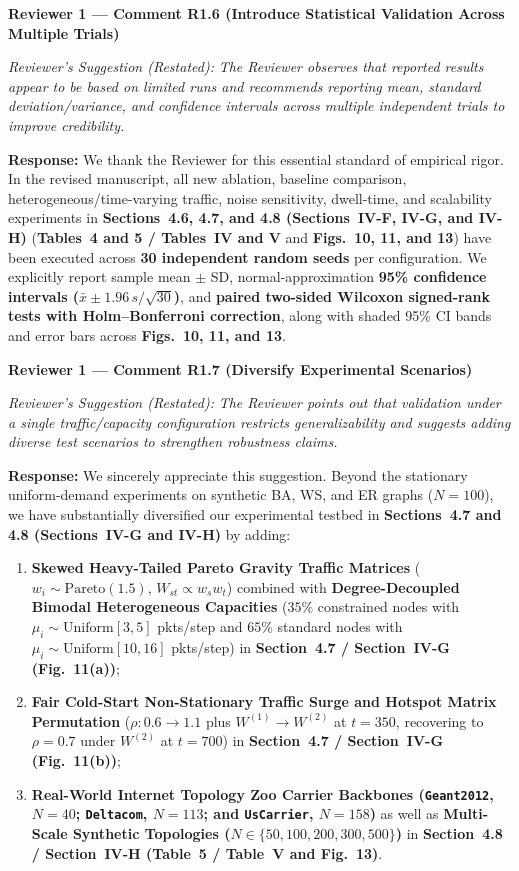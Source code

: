 \documentclass[11pt,a4paper]{article}
\newcommand{\cbox}[2]{%
  \vspace{0.6em}\noindent\textbf{#1}\par\smallskip
  \noindent\textit{Reviewer's Suggestion (Restated):} \textit{#2}\par\smallskip
}
\begin{document}
\hrulefill

\cbox{Reviewer 1 --- Comment R1.6 (Introduce Statistical Validation Across Multiple Trials)}{The Reviewer observes that reported results appear to be based on limited runs and recommends reporting mean, standard deviation/variance, and confidence intervals across multiple independent trials to improve credibility.}

\noindent\textbf{Response:} We thank the Reviewer for this essential standard of empirical rigor. In the revised manuscript, all new ablation, baseline comparison, heterogeneous/time-varying traffic, noise sensitivity, dwell-time, and scalability experiments in \textbf{Sections~4.6, 4.7, and 4.8 (Sections~IV-F, IV-G, and IV-H)} (\textbf{Tables~4 and 5 / Tables~IV and V} and \textbf{Figs.~10, 11, and 13}) have been executed across \textbf{30 independent random seeds} per configuration. We explicitly report sample mean $\pm$ SD, normal-approximation \textbf{95\% confidence intervals ($\bar{x} \pm 1.96\,s/\sqrt{30}$)}, and \textbf{paired two-sided Wilcoxon signed-rank tests with Holm--Bonferroni correction}, along with shaded 95\% CI bands and error bars across \textbf{Figs.~10, 11, and 13}.

\hrulefill

\cbox{Reviewer 1 --- Comment R1.7 (Diversify Experimental Scenarios)}{The Reviewer points out that validation under a single traffic/capacity configuration restricts generalizability and suggests adding diverse test scenarios to strengthen robustness claims.}

\noindent\textbf{Response:} We sincerely appreciate this suggestion. Beyond the stationary uniform-demand experiments on synthetic BA, WS, and ER graphs ($N=100$), we have substantially diversified our experimental testbed in \textbf{Sections~4.7 and 4.8 (Sections~IV-G and IV-H)} by adding:
\begin{enumerate}[leftmargin=1.8em]
    \item \textbf{Skewed Heavy-Tailed Pareto Gravity Traffic Matrices} ($w_i \sim \mathrm{Pareto}(1.5)$, $W_{st} \propto w_s w_t$) combined with \textbf{Degree-Decoupled Bimodal Heterogeneous Capacities} ($35\%$ constrained nodes with $\mu_i \sim \mathrm{Uniform}[3,5]$ pkts/step and $65\%$ standard nodes with $\mu_i \sim \mathrm{Uniform}[10,16]$ pkts/step) in \textbf{Section~4.7 / Section~IV-G (Fig.~11(a))};
    \item \textbf{Fair Cold-Start Non-Stationary Traffic Surge and Hotspot Matrix Permutation} ($\rho: 0.6 \to 1.1$ plus $W^{(1)}\to W^{(2)}$ at $t=350$, recovering to $\rho=0.7$ under $W^{(2)}$ at $t=700$) in \textbf{Section~4.7 / Section~IV-G (Fig.~11(b))};
    \item \textbf{Real-World Internet Topology Zoo Carrier Backbones (\texttt{Geant2012}, $N=40$; \texttt{Deltacom}, $N=113$; and \texttt{UsCarrier}, $N=158$)} as well as \textbf{Multi-Scale Synthetic Topologies ($N \in \{50, 100, 200, 300, 500\}$)} in \textbf{Section~4.8 / Section~IV-H (Table~5 / Table~V and Fig.~13)}.
\end{enumerate}
\end{document}
